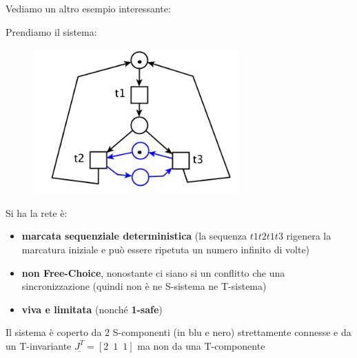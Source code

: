 \documentclass[a4paper,12pt, oneside]{book}
\begin{document}
Vediamo un altro esempio interessante:
\begin{esempio}
  Prendiamo il sistema:
  \begin{figure}[H]
    \centering
    \includegraphics[scale = 0.6]{img/nfc.jpg}
  \end{figure}
  Si ha la rete è:
  \begin{itemize}
    \item \textbf{marcata sequenziale deterministica} (la sequenza $t 1 t 2 t 1
    t 3$ rigenera la marcatura iniziale e può essere ripetuta un numero infinito
    di volte)
    \item \textbf{non Free-Choice}, nonostante ci siano si un conflitto che una
    sincronizzazione (quindi non è ne 
    S-sistema ne T-sistema)
    \item \textbf{viva e limitata} (nonché \textbf{1-safe})
  \end{itemize}
  Il sistema è coperto da 2 S-componenti (in blu e nero) strettamente connesse e
  da un T-invariante $\underline{J^T}=[2\,\,\,1\,\,\,1]$ ma non da una
  T-componente 
\end{esempio}
\end{document}
